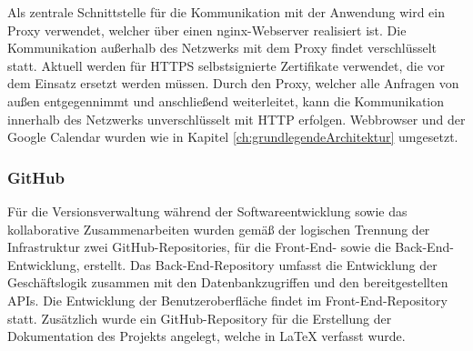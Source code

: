 Als zentrale Schnittstelle für die Kommunikation mit der Anwendung wird ein Proxy verwendet, welcher über einen nginx-Webserver realisiert ist.
Die Kommunikation außerhalb des Netzwerks mit dem Proxy findet verschlüsselt statt.
Aktuell werden für \acs{HTTPS} selbstsignierte Zertifikate verwendet, die vor dem Einsatz ersetzt werden müssen.
Durch den Proxy, welcher alle Anfragen von außen entgegennimmt und anschließend weiterleitet, kann die Kommunikation innerhalb des Netzwerks unverschlüsselt mit \acs{HTTP} erfolgen.
Webbrowser und der Google Calendar wurden wie in Kapitel \ref{ch:grundlegendeArchitektur} umgesetzt.

\subsubsection{GitHub}
Für die Versionsverwaltung während der Softwareentwicklung sowie das kollaborative Zusammenarbeiten wurden gemäß der logischen Trennung der Infrastruktur zwei GitHub-Repositories, für die Front-End- sowie die Back-End-Entwicklung, erstellt.
Das Back-End-Repository umfasst die Entwicklung der Geschäftslogik zusammen mit den Datenbankzugriffen und den bereitgestellten \ac{API}s.
Die Entwicklung der Benutzeroberfläche findet im Front-End-Repository statt.
Zusätzlich wurde ein GitHub-Repository für die Erstellung der Dokumentation des Projekts angelegt, welche in LaTeX verfasst wurde.
